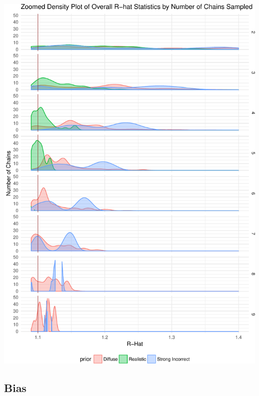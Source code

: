 \documentclass{beamer}
\begin{document}
\begin{frame}
\begin{center}
	\includegraphics[scale=.30]{zoomed_denisity_convergence.pdf}
	\end{center}
\end{frame}


\subsection{Bias}
\end{document}
